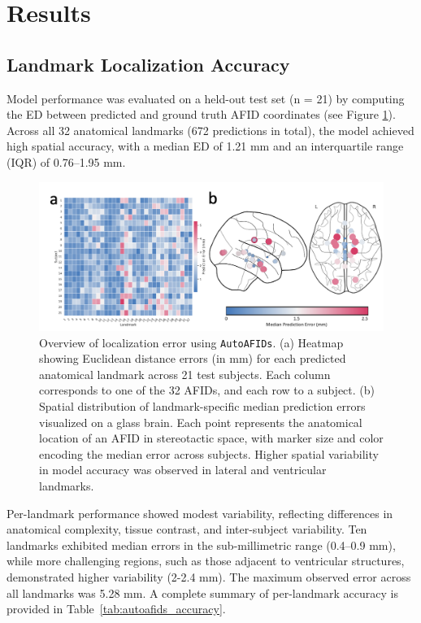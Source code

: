 \section{Results}
\subsection{Landmark Localization Accuracy}
Model performance was evaluated on a held-out test set (n = 21) by computing the ED between predicted and ground truth AFID coordinates (see Figure \ref{fig:ch3_Figure_autoscore}). Across all 32 anatomical landmarks (672 predictions in total), the model achieved high spatial accuracy, with a median ED of 1.21 mm and an interquartile range (IQR) of 0.76–1.95 mm. 

\begin{figure}[hbt!]
    \centering
    \includegraphics[width=1\linewidth]{figs/ch3_Figure_autoscore.png}
    \caption{Overview of localization error using \texttt{AutoAFIDs}. (a) Heatmap showing Euclidean distance errors (in mm) for each predicted anatomical landmark across 21 test subjects. Each column corresponds to one of the 32 AFIDs, and each row to a subject. (b) Spatial distribution of landmark-specific median prediction errors visualized on a glass brain. Each point represents the anatomical location of an AFID in stereotactic space, with marker size and color encoding the median error across subjects. Higher spatial variability in model accuracy was observed in lateral and ventricular landmarks.}
    \label{fig:ch3_Figure_autoscore}
\end{figure}


Per-landmark performance showed modest variability, reflecting differences in anatomical complexity, tissue contrast, and inter-subject variability. Ten landmarks exhibited median errors in the sub-millimetric range (0.4–0.9 mm), while more challenging regions, such as those adjacent to ventricular structures, demonstrated higher variability (2-2.4 mm). The maximum observed error across all landmarks was 5.28 mm. A complete summary of per-landmark accuracy is provided in Table~\ref{tab:autoafids_accuracy}.


